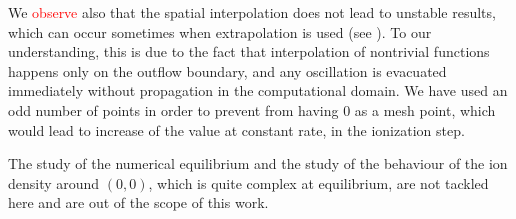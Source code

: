 \documentclass{article}
\numberwithin{equation}{section}
\begin{document}
%
%
%
%

We \textcolor{red}{observe} also that the spatial interpolation does not lead to unstable results, which can occur sometimes when extrapolation is used (see \cite{badsiNumericalStabilityPlasma2018}). 
To our understanding, this is due to the fact that interpolation of nontrivial functions happens only on the outflow boundary, and any oscillation is evacuated immediately without propagation in the computational domain. 
We have used an odd number of points in order to prevent from having $0$ as a mesh point, which would lead to increase of the value at constant rate, in the ionization step.

The study of the numerical equilibrium and the study of the behaviour of the ion density around $(0,0)$, which is quite complex at equilibrium, are not tackled here and are out of the scope of this work.
\end{document}
